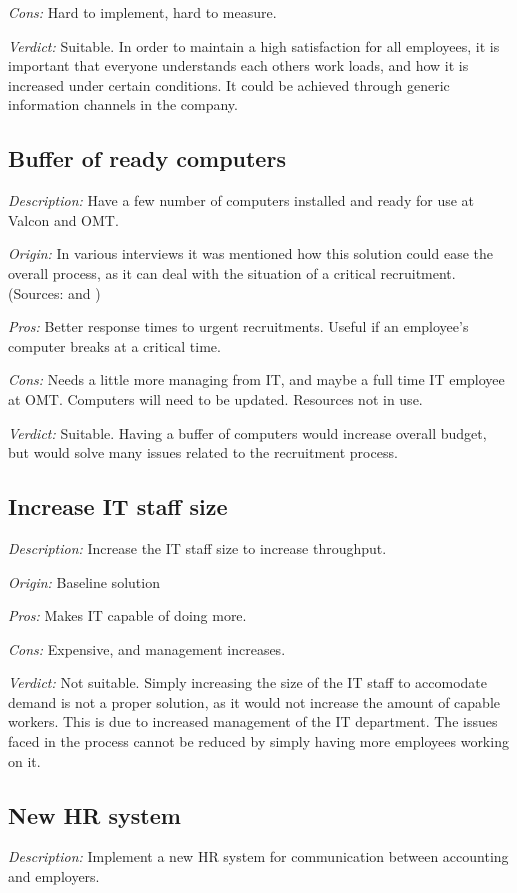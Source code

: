 \noindent \emph{Cons:} Hard to implement, hard to measure.

\emph{Verdict:}
Suitable. In order to maintain a high satisfaction for all employees, it is important that everyone understands each others work loads, and how it is increased under certain conditions. It could be achieved through generic information channels in the company.

\subsection{Buffer of ready computers}
\emph{Description:} Have a few number of computers installed and ready for use at Valcon and OMT.

\emph{Origin:}
In various interviews it was mentioned how this solution could ease the overall process, as it can deal with the situation of a critical recruitment.
(Sources:  and )

\noindent \emph{Pros:} Better response times to urgent recruitments. Useful if an employee's computer breaks at a critical time.

\noindent \emph{Cons:} Needs a little more managing from IT, and maybe a full time IT employee at OMT. Computers will need to be updated. Resources not in use.

\emph{Verdict:}
Suitable. Having a buffer of computers would increase overall budget, but would solve many issues related to the recruitment process.

\subsection{Increase IT staff size}
\emph{Description:} Increase the IT staff size to increase throughput.

\emph{Origin:}
Baseline solution

\noindent \emph{Pros:} Makes IT capable of doing more.

\noindent \emph{Cons:} Expensive, and management increases.

\emph{Verdict:}
Not suitable. Simply increasing the size of the IT staff to accomodate demand is not a proper solution, as it would not increase the amount of capable workers. This is due to increased management of the IT department. The issues faced in the process cannot be reduced by simply having more employees working on it.

\subsection{New HR system}
\emph{Description:} Implement a new HR system for communication between accounting and employers.

